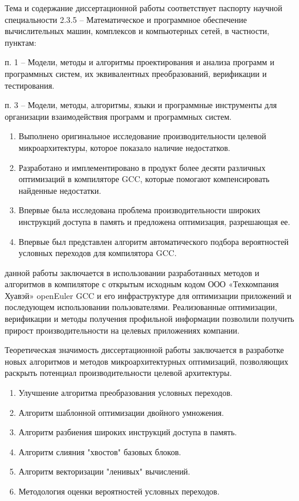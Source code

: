 Тема и содержание диссертационной работы соответствует паспорту научной
специальности 2.3.5 – Математическое и программное обеспечение вычислительных машин, комплексов и компьютерных сетей, в частности, пунктам:

п. 1 – Модели, методы и алгоритмы проектирования и анализа программ
и программных систем, их эквивалентных преобразований, верификации и тестирования.

п. 3 – Модели, методы, алгоритмы, языки и программные инструменты
для организации взаимодействия программ и программных систем.

{\novelty}
\begin{enumerate}[beginpenalty=10000] %
  \item Выполнено оригинальное исследование производительности целевой микроархитектуры, которое показало наличие недостатков.
  \item Разработано и имплементировано в продукт более десяти различных оптимизаций в компиляторе GCC, которые помогают компенсировать найденные недостатки.
  \item Впервые была исследована проблема производительности широких инструкций доступа в память и предложена оптимизация, разрешающая ее. 
  \item Впервые был представлен алгоритм автоматического подбора вероятностей условных переходов для компилятора GCC.
\end{enumerate}

{\influence}  данной работы заключается в использовании
разработанных методов и алгоритмов в  компиляторе с открытым исходным кодом  ООО «Техкомпания Хуавэй»  openEuler GCC и его
инфраструктуре для оптимизации приложений и последующем использовании пользователями. Реализованные оптимизации, верификации
и методы получения профильной информации позволили получить прирост производительности
на целевых приложениях компании.

Теоретическая значимость диссертационной работы заключается в разработке
новых алгоритмов и методов микроархитектурных оптимизаций, позволяющих раскрыть потенциал производительности целевой архитектуры.


{}
\begin{enumerate}[beginpenalty=10000] %
  \item Улучшение алгоритма преобразования условных переходов.
  \item Алгоритм шаблонной оптимизации двойного умножения.
  \item Алгоритм разбиения широких инструкций доступа в память.
  \item Алгоритм слияния "хвостов"\phantom{ } базовых блоков.
  \item Алгоритм векторизации "ленивых"\phantom{ } вычислений.
  \item Методология оценки вероятностей условных переходов.
\end{enumerate}

